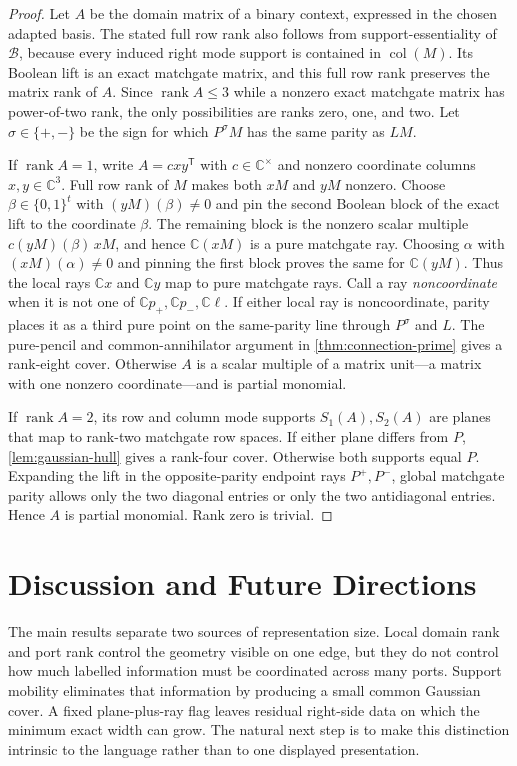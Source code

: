 \documentclass[11pt]{article}
\theoremstyle{definition}
\theoremstyle{remark}
\newcommand{\C}{\mathbb C}
\newcommand{\bits}{\{0,1\}}
\newcommand{\trans}{\mathsf T}
\newcommand{\rank}{\operatorname{rank}}
\begin{document}
\begin{proof}
Let $A$ be the domain matrix of a binary context, expressed in the chosen
adapted basis.  The stated full row rank also follows from
support-essentiality of $\mathcal B$, because every induced right mode
support is contained in $\operatorname{col}(M)$.  Its Boolean lift is an exact matchgate matrix, and this full
row rank preserves the matrix rank of $A$.  Since $\rank A\le3$ while a
nonzero exact matchgate matrix has power-of-two rank, the only possibilities
are ranks zero, one, and two.  Let $\sigma\in\{+,-\}$ be the sign for which
$P^\sigma M$ has the same parity as $LM$.

If $\rank A=1$, write $A=cxy^{\trans}$ with
$c\in\C^\times$ and nonzero coordinate columns $x,y\in\C^3$.  Full row
rank of $M$ makes both $xM$ and $yM$ nonzero.  Choose
$\beta\in\bits^t$ with $(yM)(\beta)\ne0$ and pin the second Boolean block of
the exact lift to the coordinate $\beta$.  The remaining block is the
nonzero scalar multiple $c(yM)(\beta)\,xM$, and hence $\C(xM)$ is a pure
matchgate ray.  Choosing $\alpha$ with $(xM)(\alpha)\ne0$ and pinning the
first block proves the same for $\C(yM)$.  Thus the local rays $\C x$ and
$\C y$ map to pure matchgate rays.
Call a ray \emph{noncoordinate} when it is not one of
$\C p_+,\C p_-,\C\ell$.  If either local ray is noncoordinate, parity places
it as a third pure
point on the same-parity line through $P^\sigma$ and $L$.  The pure-pencil
and common-annihilator argument in \cref{thm:connection-prime} gives a
rank-eight cover.  Otherwise $A$ is a scalar multiple of a matrix unit---a
matrix with one nonzero coordinate---and is partial monomial.

If $\rank A=2$, its row and column mode supports $S_1(A),S_2(A)$ are planes
that map to rank-two matchgate row spaces.  If either plane differs from $P$,
\cref{lem:gaussian-hull} gives a rank-four cover.  Otherwise both supports
equal $P$.  Expanding the lift in the opposite-parity endpoint rays
$P^+,P^-$, global matchgate parity allows only the two diagonal entries or
only the two antidiagonal entries.  Hence $A$ is partial monomial.  Rank
zero is trivial.
\end{proof}

\section{Discussion and Future Directions}
\label{sec:discussion}

The main results separate two sources of representation size.  Local domain
rank and port rank control the geometry visible on one edge, but they do not
control how much labelled information must be coordinated across many ports.
Support mobility eliminates that information by producing a small common
Gaussian cover.  A fixed plane-plus-ray flag leaves residual right-side data
on which the minimum exact width can grow.  The natural next step is to make
this distinction intrinsic to the language rather than to one displayed
presentation.
\end{document}
